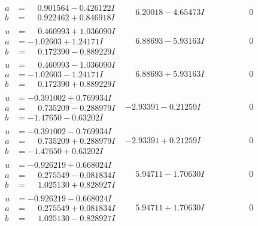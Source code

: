 \documentclass[1p]{elsarticle_modified}
\theoremstyle{definition}
\begin{document}
$$\begin{array}{c|c|c}
\begin{aligned}
a &= \phantom{-}0.901564 - 0.426122 I \\
b &= \phantom{-}0.922462 + 0.846918 I\end{aligned}
 & \phantom{-}6.20018 - 4.65473 I & \phantom{-0.000000 } 0 \\ \hline\begin{aligned}
u &= \phantom{-}0.460993 + 1.036090 I \\
a &= -1.02603 + 1.24171 I \\
b &= \phantom{-}0.172390 - 0.889229 I\end{aligned}
 & \phantom{-}6.88693 - 5.93163 I & \phantom{-0.000000 } 0 \\ \hline\begin{aligned}
u &= \phantom{-}0.460993 - 1.036090 I \\
a &= -1.02603 - 1.24171 I \\
b &= \phantom{-}0.172390 + 0.889229 I\end{aligned}
 & \phantom{-}6.88693 + 5.93163 I & \phantom{-0.000000 } 0 \\ \hline\begin{aligned}
u &= -0.391002 + 0.769934 I \\
a &= \phantom{-}0.735209 - 0.288979 I \\
b &= -1.47650 - 0.63202 I\end{aligned}
 & -2.93391 - 0.21259 I & \phantom{-0.000000 } 0 \\ \hline\begin{aligned}
u &= -0.391002 - 0.769934 I \\
a &= \phantom{-}0.735209 + 0.288979 I \\
b &= -1.47650 + 0.63202 I\end{aligned}
 & -2.93391 + 0.21259 I & \phantom{-0.000000 } 0 \\ \hline\begin{aligned}
u &= -0.926219 + 0.668024 I \\
a &= \phantom{-}0.275549 - 0.081834 I \\
b &= \phantom{-}1.025130 + 0.828927 I\end{aligned}
 & \phantom{-}5.94711 - 1.70630 I & \phantom{-0.000000 } 0 \\ \hline\begin{aligned}
u &= -0.926219 - 0.668024 I \\
a &= \phantom{-}0.275549 + 0.081834 I \\
b &= \phantom{-}1.025130 - 0.828927 I\end{aligned}
 & \phantom{-}5.94711 + 1.70630 I & \phantom{-0.000000 } 0 \\ \hline\begin{aligned}

\end{aligned}
\end{array}$$
\end{document}
